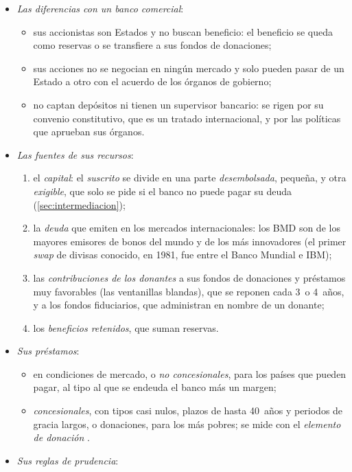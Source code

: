 \documentclass[11pt]{article}
\begin{document}
\begin{itemize}
\item \emph{Las diferencias con un banco comercial}:
  \begin{itemize}
  \item sus accionistas son Estados y no buscan beneficio: el beneficio se queda como reservas o se transfiere a sus fondos de donaciones;
  \item sus acciones no se negocian en ningún mercado y solo pueden pasar de un Estado a otro con el acuerdo de los órganos de gobierno;
  \item no captan depósitos ni tienen un supervisor bancario: se rigen por su convenio constitutivo, que es un tratado internacional, y por las políticas que aprueban sus órganos.
  \end{itemize}
\item \emph{Las fuentes de sus recursos}:
  \begin{enumerate}
  \item el \emph{capital}: el \emph{suscrito} se divide en una parte \emph{desembolsada}, pequeña, y otra \emph{exigible}, que solo se pide si el banco no puede pagar su deuda (\ref{sec:intermediacion});
  \item la \emph{deuda} que emiten en los mercados internacionales: los BMD son de los mayores emisores de bonos del mundo y de los más innovadores (el primer \emph{swap} de divisas conocido, en 1981, fue entre el Banco Mundial e IBM)\nocite{BM2026Historia};
  \item las \emph{contribuciones de los donantes} a sus fondos de donaciones y préstamos muy favorables (las ventanillas blandas), que se reponen cada 3~o 4~años, y a los fondos fiduciarios, que administran en nombre de un donante;
  \item los \emph{beneficios retenidos}, que suman reservas.
  \end{enumerate}
\item \emph{Sus préstamos}:
  \begin{itemize}
  \item en condiciones de mercado, o \emph{no concesionales}, para los países que pueden pagar, al tipo al que se endeuda el banco más un margen;
  \item \emph{concesionales}, con tipos casi nulos, plazos de hasta 40~años y periodos de gracia largos, o donaciones, para los más pobres; se mide con el \emph{elemento de donación} .
  \end{itemize}
\item \emph{Sus reglas de prudencia}:

\end{itemize}
\end{document}
